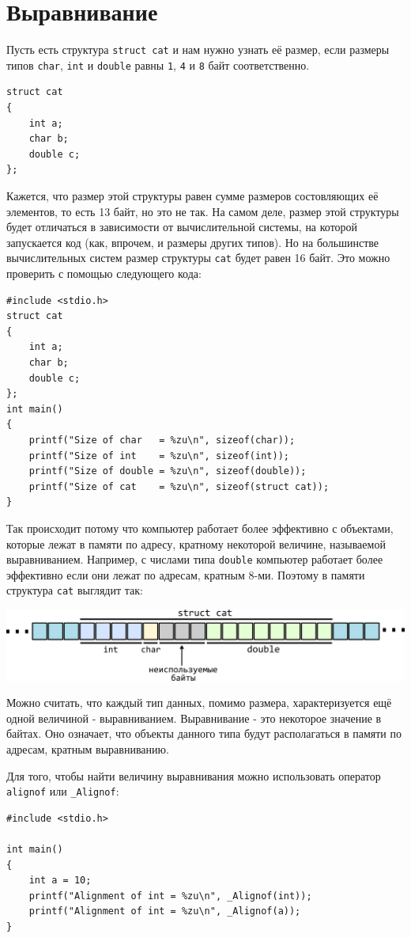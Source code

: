 \documentclass[10pt]{article}
\begin{document}
\newpage
\section*{Выравнивание}
Пусть есть структура \texttt{struct cat} и нам нужно узнать её размер, если размеры типов \texttt{char}, \texttt{int} и \texttt{double} равны \texttt{1}, \texttt{4} и \texttt{8} байт соответственно.
\begin{lstlisting}
struct cat 
{
    int a;
    char b;
    double c;
};
\end{lstlisting}
Кажется, что размер этой структуры равен сумме размеров состовляющих её элементов, то есть 13 байт, но это не так. На самом деле, размер этой структуры будет отличаться в зависимости от вычислительной системы, на которой запускается код (как, впрочем, и размеры других типов). Но на большинстве вычислительных систем размер структуры \texttt{cat} будет равен 16 байт. Это можно проверить с помощью следующего кода:
\begin{lstlisting}
#include <stdio.h>
struct cat 
{
    int a;
    char b;
    double c;
};
int main() 
{
    printf("Size of char   = %zu\n", sizeof(char));
    printf("Size of int    = %zu\n", sizeof(int));
    printf("Size of double = %zu\n", sizeof(double));
    printf("Size of cat    = %zu\n", sizeof(struct cat));
}
\end{lstlisting}

Так происходит потому что компьютер работает более эффективно с объектами, которые лежат в памяти по адресу, кратному некоторой величине, называемой выравниванием. Например, с числами типа \texttt{double} компьютер работает более эффективно если они лежат по адресам, кратным 8-ми. Поэтому в памяти структура \texttt{cat} выглядит так: 

\begin{center}
\includegraphics[scale=1]{../images/alignment.png}
\end{center}

Можно считать, что каждый тип данных, помимо размера, характеризуется ещё одной величиной - выравниванием. Выравнивание - это некоторое значение в байтах. Оно означает, что объекты данного типа будут располагаться в памяти по адресам, кратным выравниванию.

Для того, чтобы найти величину выравнивания можно использовать оператор \texttt{alignof} или \texttt{\_Alignof}:
\begin{lstlisting}
#include <stdio.h>

int main() 
{
    int a = 10;
    printf("Alignment of int = %zu\n", _Alignof(int));
    printf("Alignment of int = %zu\n", _Alignof(a));
}
\end{lstlisting}
\end{document}
